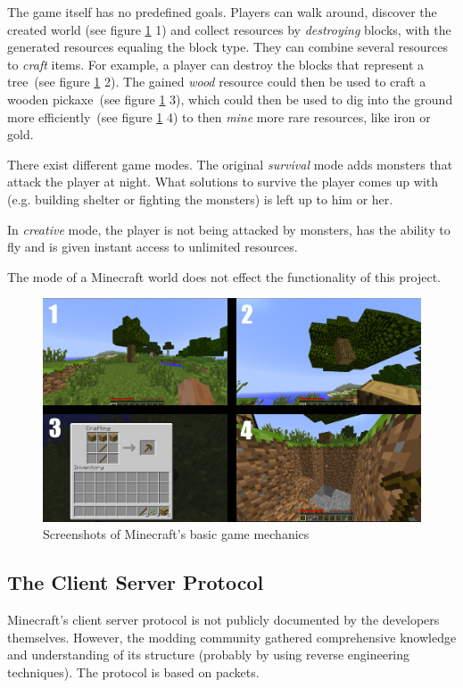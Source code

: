 The game itself has no predefined goals. Players can walk around, discover the created world (see figure \ref{mc_mechanics} 1) and collect resources by \emph{destroying} blocks, with the generated resources equaling the block type. They can combine several resources to \emph{craft} items. For example, a player can destroy the blocks that represent a tree~(see figure \ref{mc_mechanics} 2). The gained \emph{wood} resource could then be used to craft a wooden pickaxe~(see figure \ref{mc_mechanics} 3), which could then be used to dig into the ground more efficiently~(see figure \ref{mc_mechanics} 4) to then \emph{mine} more rare resources, like iron or gold.

There exist different game modes. The original \emph{survival} mode adds monsters that attack the player at night. What solutions to survive the player comes up with (e.g. building shelter or fighting the monsters) is left up to him or her.

In \emph{creative} mode, the player is not being attacked by monsters, has the ability to fly and is given instant access to unlimited resources.

The mode of a Minecraft world does not effect the functionality of this project.

\begin{figure}[h]
  \centering
    \includegraphics[width=15cm]{graphics/minecraft_mechanics}
  \caption{Screenshots of Minecraft's basic game mechanics}
  \label{mc_mechanics}
\end{figure}

        \subsection{The Client Server Protocol}
        \label{client_server_protocol}
Minecraft's client server protocol is not publicly documented by the developers themselves. However, the modding community gathered comprehensive knowledge and understanding of its structure (probably by using reverse engineering techniques). The protocol is based on packets. 

